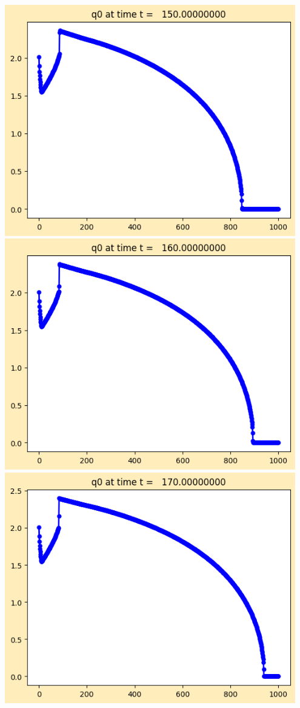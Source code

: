 \documentclass[11pt]{article}
\begin{document}
\vskip 10pt 
\includegraphics[width=0.95\textwidth]{frame0015fig1.png}
\vskip 10pt 
\includegraphics[width=0.95\textwidth]{frame0016fig1.png}
\vskip 10pt 
\includegraphics[width=0.95\textwidth]{frame0017fig1.png}
\end{document}
